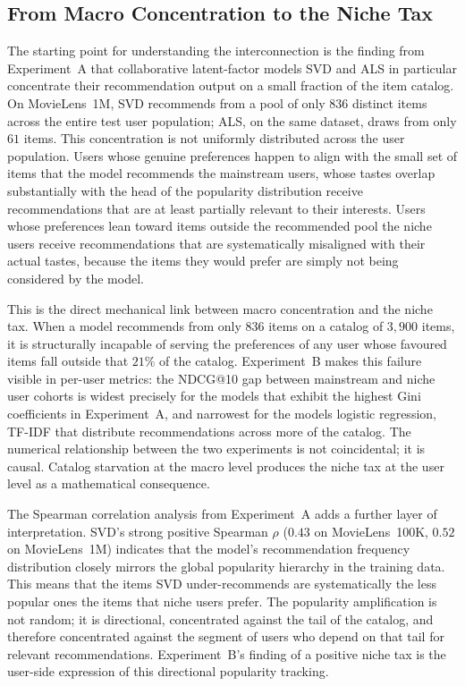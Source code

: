 \documentclass[11pt,a4paper]{report}
\begin{document}
\subsection*{From Macro Concentration to the Niche Tax}

The starting point for understanding the interconnection is the finding from Experiment~A that collaborative latent-factor models SVD and ALS in particular concentrate their recommendation output on a small fraction of the item catalog. On MovieLens~1M, SVD recommends from a pool of only $836$ distinct items across the entire test user population; ALS, on the same dataset, draws from only $61$ items. This concentration is not uniformly distributed across the user population. Users whose genuine preferences happen to align with the small set of items that the model recommends the mainstream users, whose tastes overlap substantially with the head of the popularity distribution receive recommendations that are at least partially relevant to their interests. Users whose preferences lean toward items outside the recommended pool the niche users receive recommendations that are systematically misaligned with their actual tastes, because the items they would prefer are simply not being considered by the model.

This is the direct mechanical link between macro concentration and the niche tax. When a model recommends from only $836$ items on a catalog of $3{,}900$ items, it is structurally incapable of serving the preferences of any user whose favoured items fall outside that $21\%$ of the catalog. Experiment~B makes this failure visible in per-user metrics: the NDCG@10 gap between mainstream and niche user cohorts is widest precisely for the models that exhibit the highest Gini coefficients in Experiment~A, and narrowest for the models logistic regression, TF-IDF that distribute recommendations across more of the catalog. The numerical relationship between the two experiments is not coincidental; it is causal. Catalog starvation at the macro level produces the niche tax at the user level as a mathematical consequence.

The Spearman correlation analysis from Experiment~A adds a further layer of interpretation. SVD's strong positive Spearman $\rho$ ($0.43$ on MovieLens~100K, $0.52$ on MovieLens~1M) indicates that the model's recommendation frequency distribution closely mirrors the global popularity hierarchy in the training data. This means that the items SVD under-recommends are systematically the less popular ones the items that niche users prefer. The popularity amplification is not random; it is directional, concentrated against the tail of the catalog, and therefore concentrated against the segment of users who depend on that tail for relevant recommendations. Experiment~B's finding of a positive niche tax is the user-side expression of this directional popularity tracking.
\end{document}
